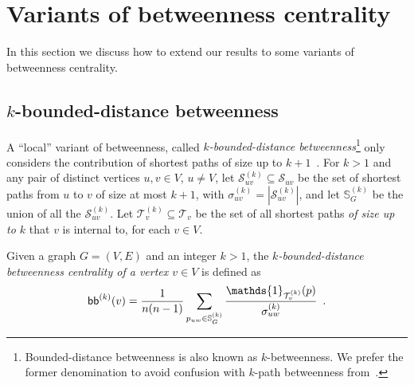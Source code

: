 \ifproof
\section{Variants of betweenness centrality}\label{sec:variants}
In this section we discuss how to extend our results to some variants of
betweenness centrality.

\subsection{$k$-bounded-distance betweenness}
A ``local'' variant of betweenness, called \emph{$k$-bounded-distance
betweenness}\footnote{Bounded-distance betweenness is also known as
$k$-betweenness. We prefer the former denomination to avoid confusion with
$k$-path betweenness from~\citep{KourtellisASIT12}.} only considers
the contribution of shortest paths of size up to $k+1$~\citep{BorgattiE06,Brandes08}.
For $k>1$ and any pair of distinct vertices $u,v\in V$, $u\neq V$, let
$\mathcal{S}^{(k)}_{uv}\subseteq\mathcal{S}_{uv}$ be the set of shortest paths
from $u$ to $v$ of size at most $k+1$, with
$\sigma^{(k)}_{uv}=|\mathcal{S}^{(k)}_{uv}|$, and let $\mathbb{S}^{(k)}_G$ be the
union of all the $\mathcal{S}^{(k)}_{uv}$. Let
$\mathcal{T}^{(k)}_v\subseteq\mathcal{T}_v$ be the set of all shortest paths
\emph{of size up to $k$} that $v$ is internal to, for each $v\in V$.

\begin{definition}\label{def:kboundbetweenness}
  \citep{BorgattiE06,Brandes08} Given a graph $G=(V,E)$ and an integer $k>1$,
  the \emph{$k$-bounded-distance betweenness centrality of a vertex $v\in V$} is
  defined as
  \[
  \kboundbetw^{(k)}(v)=\frac{1}{n(n-1)}\sum_{p_{uw}\in\mathbb{S}^{(k)}_G}\frac{\mathds{1}_{\mathcal{T}^{(k)}_v}(p)}{\sigma^{(k)}_{uw}}
  \enspace.
  \]
\end{definition}

